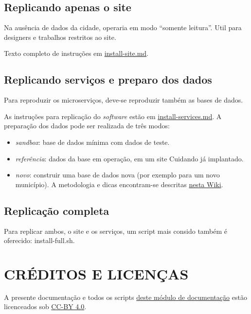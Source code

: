 \documentclass[letterpaper,10pt,english]{sphinxmanual}
\begin{document}
\section{Replicando apenas o site}
\label{index:replicando-apenas-o-site}
Na ausência de dados da cidade, operaria em modo ``somente leitura''. Util
para designers e trabalhos restritos ao site.

Texto completo de instruções em \href{https://github.com/okfn-brasil/cuidando2-doc/blob/master/install-services.md}{install-site.md}.


\section{Replicando serviços e preparo dos dados}
\label{index:replicando-servicos-e-preparo-dos-dados}
Para reproduzir os microserviços, deve-se reproduzir também as bases de
dados.

As instruções para replicação do \emph{software} estão em
\href{https://github.com/okfn-brasil/cuidando2-doc/blob/master/install-services.md}{install-services.md}. A preparação dos dados
pode ser realizada de três modos:
\begin{itemize}
\item {} 
\emph{sandbox}: base de dados mínima com dados de teste.

\item {} 
\emph{referência}: dados da base em operação, em um site Cuidando já
implantado.

\item {} 
\emph{novo}: construir uma base de dados nova (por exemplo para um novo
município). A metodologia e dicas encontram-se descritas \href{https://pt.wikiversity.org/wiki/Projeto\_Cuidando\_do\_Meu\_Bairro/Novos\_dados}{nesta
Wiki}.

\end{itemize}


\section{Replicação completa}
\label{index:replicacao-completa}
Para replicar ambos, o site e os serviços, um script mais consido também
é oferecido: install-full.sh.


\chapter{CRÉDITOS E LICENÇAS}
\label{index:creditos-e-licencas}
A presente documentação e todos os scripts \href{https://github.com/okfn-brasil/cuidando2-doc}{deste módulo de
documentação} estão
licenceados sob \href{http://creativecommons.org/licenses/by/4.0/}{CC-BY 4.0}.
\end{document}

